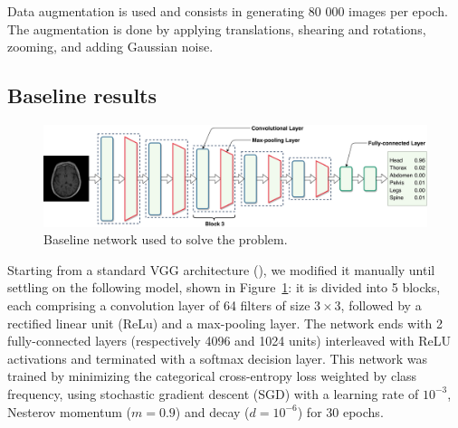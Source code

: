 Data augmentation is used and consists in generating 80 000 images per epoch. The augmentation is done by applying translations, shearing and rotations, zooming, and adding Gaussian noise.

\subsection{Baseline results}

\begin{figure}[htb]
	\centering
	\includegraphics[width=\linewidth]{img_hyperopt/baseline.pdf}
	\caption{Baseline network used to solve the problem.}
	\label{fig:baseline}
\end{figure}

Starting from a standard VGG architecture (\textcite{simonyan2014}), we modified it manually until settling on the following model, shown in Figure~\ref{fig:baseline}: it is divided into 5 blocks, each comprising a convolution layer of 64 filters of size $3\times 3$, followed by a rectified linear unit (ReLu) and a max-pooling layer. The network ends with 2 fully-connected layers (respectively 4096 and 1024 units) interleaved with ReLU activations and terminated with a softmax decision layer. This network was trained by minimizing the categorical cross-entropy loss weighted by class frequency, using stochastic gradient descent (SGD) with a learning rate of $10^{-3}$, Nesterov momentum ($m = 0.9$) and decay ($d = 10^{-6}$) for 30 epochs.

